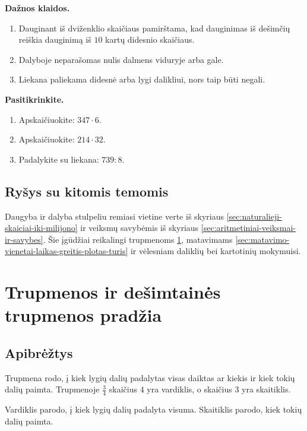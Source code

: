 \textbf{Dažnos klaidos.}
\begin{enumerate}[label=\arabic*.]
\item Dauginant iš dviženklio skaičiaus pamirštama, kad dauginimas iš dešimčių reiškia dauginimą iš \(10\) kartų didesnio skaičiaus.
\item Dalyboje neparašomas nulis dalmens viduryje arba gale.
\item Liekana paliekama didesnė arba lygi dalikliui, nors taip būti negali.
\end{enumerate}

\textbf{Pasitikrinkite.}
\begin{enumerate}[label=\arabic*.]
\item Apskaičiuokite: \(347\cdot6\).
\item Apskaičiuokite: \(214\cdot32\).
\item Padalykite su liekana: \(739:8\).
\end{enumerate}

\subsection{Ryšys su kitomis temomis}

Daugyba ir dalyba stulpeliu remiasi vietine verte iš skyriaus \ref{sec:naturalieji-skaiciai-iki-milijono} ir veiksmų savybėmis iš skyriaus \ref{sec:aritmetiniai-veiksmai-ir-savybes}. Šie įgūdžiai reikalingi trupmenoms \ref{sec:trupmenos-ir-desimtaines-trupmenos-pradzia}, matavimams \ref{sec:matavimo-vienetai-laikas-greitis-plotas-turis} ir vėlesniam daliklių bei kartotinių mokymuisi.

\section{Trupmenos ir dešimtainės trupmenos pradžia}\label{sec:trupmenos-ir-desimtaines-trupmenos-pradzia}

\subsection{Apibrėžtys}

\begin{apibreztis}
Trupmena rodo, į kiek lygių dalių padalytas visas daiktas ar kiekis ir kiek tokių dalių paimta. Trupmenoje \(\frac{3}{4}\) skaičius \(4\) yra vardiklis, o skaičius \(3\) yra skaitiklis.
\end{apibreztis}

\begin{apibreztis}
Vardiklis parodo, į kiek lygių dalių padalyta visuma. Skaitiklis parodo, kiek tokių dalių paimta.
\end{apibreztis}

